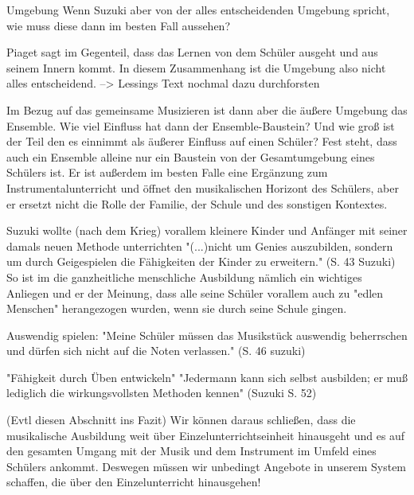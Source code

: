 Umgebung
Wenn Suzuki aber von der alles entscheidenden Umgebung spricht, wie muss diese
dann im besten Fall aussehen? 

Piaget sagt im Gegenteil, dass das Lernen von dem Schüler ausgeht und aus seinem
Innern kommt. In diesem Zusammenhang ist die Umgebung also nicht alles entscheidend.
--> Lessings Text nochmal dazu durchforsten

Im Bezug auf das gemeinsame Musizieren ist dann aber die äußere Umgebung das
Ensemble. Wie viel Einfluss hat dann der Ensemble-Baustein? Und wie groß ist der
Teil den es einnimmt als äußerer Einfluss auf einen Schüler? Fest steht, dass
auch ein Ensemble alleine nur ein Baustein von der Gesamtumgebung eines Schülers
ist. Er ist außerdem im besten Falle eine Ergänzung zum Instrumentalunterricht
und öffnet den musikalischen Horizont des Schülers, aber er ersetzt nicht die
Rolle der Familie, der Schule und des sonstigen Kontextes. 

Suzuki wollte (nach dem Krieg) vorallem kleinere Kinder und Anfänger mit seiner
damals neuen Methode unterrichten "(...)nicht um Genies auszubilden, sondern um
durch Geigespielen die Fähigkeiten der Kinder zu erweitern." (S. 43 Suzuki) So
ist im die ganzheitliche menschliche Ausbildung nämlich ein wichtiges Anliegen
und er der Meinung, dass alle seine Schüler vorallem auch zu "edlen Menschen"
herangezogen wurden, wenn sie durch seine Schule gingen. 

Auswendig spielen: "Meine Schüler müssen das Musikstück auswendig beherrschen
und dürfen sich nicht auf die Noten verlassen." (S. 46 suzuki)

"Fähigkeit durch Üben entwickeln" "Jedermann kann sich selbst ausbilden; er muß
lediglich die wirkungsvollsten Methoden kennen" (Suzuki S. 52)

(Evtl diesen Abschnitt ins Fazit)
Wir können daraus schließen, dass die musikalische Ausbildung weit über
Einzelunterrichtseinheit hinausgeht und es auf den gesamten Umgang mit der Musik
und dem Instrument im Umfeld eines Schülers ankommt. Deswegen müssen wir
unbedingt Angebote in unserem System schaffen, die über den Einzelunterricht
hinausgehen! 
